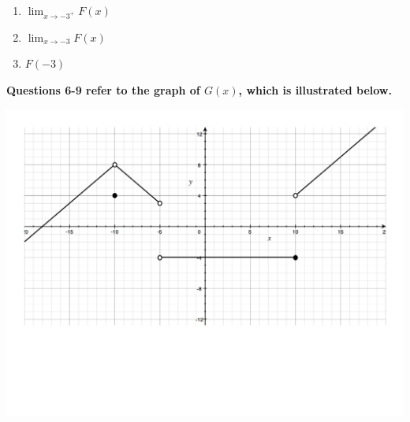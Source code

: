\documentclass[12pt]{article}
\newif\ifans
\begin{document}
\begin{enumerate}
\begin{enumerate}
\item $\displaystyle \lim_{x \rightarrow -3^{+}}{F(x)}$

\ifans{\fbox{$-1$}} \fi

\item $\displaystyle \lim_{x \rightarrow -3}{F(x)}$

\ifans{\fbox{DNE because $\displaystyle \lim_{x \rightarrow -3^{-}}{F(x)} \neq \lim_{x \rightarrow -3^{+}}{F(x)}$}} \fi

\item $F(-3)$

\ifans{\fbox{$0$}} \fi

\end{enumerate}

\end{enumerate}

{\bf Questions 6-9 refer to the graph of $G(x)$, which is illustrated below.}

\begin{center}
\includegraphics[scale=0.5]{Limits2.pdf}
\end{center}
\end{document}
